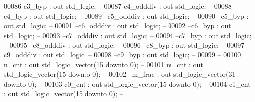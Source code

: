 \begin{DoxyCode}
00086       \textcolor{vhdlchar}{c3_byp}         \textcolor{vhdlchar}{:} \textcolor{keywordflow}{out} \textcolor{comment}{std\_logic};\textcolor{keyword}{ --}
00087       \textcolor{vhdlchar}{c4_odddiv}      \textcolor{vhdlchar}{:} \textcolor{keywordflow}{out} \textcolor{comment}{std\_logic};\textcolor{keyword}{ --}
00088       \textcolor{vhdlchar}{c4_byp}         \textcolor{vhdlchar}{:} \textcolor{keywordflow}{out} \textcolor{comment}{std\_logic};\textcolor{keyword}{ --}
00089 \textcolor{keyword}{      --c5\_odddiv    : out std\_logic; --}
00090 \textcolor{keyword}{      --c5\_byp       : out std\_logic; --}
00091 \textcolor{keyword}{      --c6\_odddiv    : out std\_logic; --}
00092 \textcolor{keyword}{      --c6\_byp       : out std\_logic; --}
00093 \textcolor{keyword}{      --c7\_odddiv    : out std\_logic; --}
00094 \textcolor{keyword}{      --c7\_byp       : out std\_logic; --}
00095 \textcolor{keyword}{      --c8\_odddiv    : out std\_logic; --}
00096 \textcolor{keyword}{      --c8\_byp       : out std\_logic; --}
00097 \textcolor{keyword}{      --c9\_odddiv    : out std\_logic; --}
00098 \textcolor{keyword}{      --c9\_byp       : out std\_logic; --}
00099 \textcolor{keyword}{      --}
00100       \textcolor{vhdlchar}{n_cnt}          \textcolor{vhdlchar}{:} \textcolor{keywordflow}{out} \textcolor{comment}{std\_logic\_vector}\textcolor{vhdlchar}{(}\textcolor{vhdllogic}{}\textcolor{vhdllogic}{15} \textcolor{keywordflow}{downto} \textcolor{vhdllogic}{}\textcolor{vhdllogic}{0}\textcolor{vhdlchar}{)};\textcolor{keyword}{ -- }
00101       \textcolor{vhdlchar}{m_cnt}          \textcolor{vhdlchar}{:} \textcolor{keywordflow}{out} \textcolor{comment}{std\_logic\_vector}\textcolor{vhdlchar}{(}\textcolor{vhdllogic}{}\textcolor{vhdllogic}{15} \textcolor{keywordflow}{downto} \textcolor{vhdllogic}{}\textcolor{vhdllogic}{0}\textcolor{vhdlchar}{)};\textcolor{keyword}{ -- }
00102 \textcolor{keyword}{      --m\_frac       : out std\_logic\_vector(31 downto 0); -- }
00103       \textcolor{vhdlchar}{c0_cnt}         \textcolor{vhdlchar}{:} \textcolor{keywordflow}{out} \textcolor{comment}{std\_logic\_vector}\textcolor{vhdlchar}{(}\textcolor{vhdllogic}{}\textcolor{vhdllogic}{15} \textcolor{keywordflow}{downto} \textcolor{vhdllogic}{}\textcolor{vhdllogic}{0}\textcolor{vhdlchar}{)};\textcolor{keyword}{ -- }
00104       \textcolor{vhdlchar}{c1_cnt}         \textcolor{vhdlchar}{:} \textcolor{keywordflow}{out} \textcolor{comment}{std\_logic\_vector}\textcolor{vhdlchar}{(}\textcolor{vhdllogic}{}\textcolor{vhdllogic}{15} \textcolor{keywordflow}{downto} \textcolor{vhdllogic}{}\textcolor{vhdllogic}{0}\textcolor{vhdlchar}{)};\textcolor{keyword}{ -- }

\end{DoxyCode}
